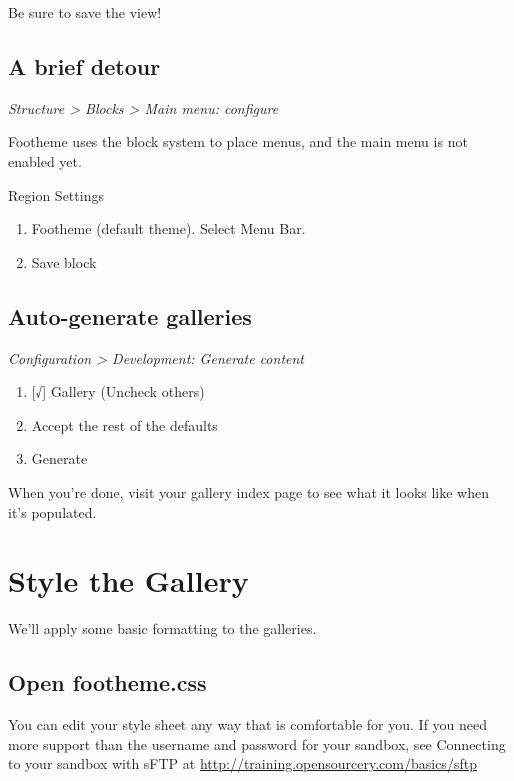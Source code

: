 \documentclass[letterpaper,10pt,english]{sphinxmanual}
\begin{document}
Be sure to save the view!


\section{A brief detour}
\label{slideshows:a-brief-detour}
\emph{Structure \textgreater{} Blocks \textgreater{} Main menu: configure}

Footheme uses the block system to place menus, and the main menu is not enabled yet.

Region Settings
\begin{enumerate}
\item {} 
Footheme (default theme). Select Menu Bar.

\item {} 
Save block

\end{enumerate}


\section{Auto-generate galleries}
\label{slideshows:auto-generate-galleries}
\emph{Configuration \textgreater{} Development: Generate content}
\begin{enumerate}
\item {} 
{[}√{]} Gallery (Uncheck others)

\item {} 
Accept the rest of the defaults

\item {} 
Generate

\end{enumerate}

When you're done, visit your gallery index page to see what it looks like when it's populated.


\chapter{Style the Gallery}
\label{slideshows:style-the-gallery}
We'll apply some basic formatting to the galleries.


\section{Open footheme.css}
\label{slideshows:open-footheme-css}
You can edit your style sheet any way that is comfortable for you. If you need more support than the username and password for your sandbox, see Connecting to your sandbox with sFTP at \href{http://training.opensourcery.com/basics/sftp}{http://training.opensourcery.com/basics/sftp}
\end{document}
